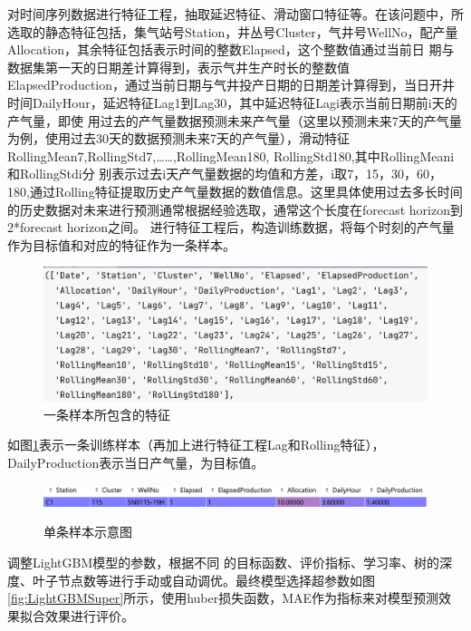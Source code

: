 对时间序列数据进行特征工程，抽取延迟特征、滑动窗口特征等。在该问题中，所选取的静态特征包括，集气站号Station，井丛号Cluster，气井号WellNo，配产量Allocation，其余特征包括表示时间的整数Elapsed，这个整数值通过当前日
期与数据集第一天的日期差计算得到，表示气井生产时长的整数值ElapsedProduction，通过当前日期与气井投产日期的日期差计算得到，当日开井时间DailyHour，延迟特征Lag1到Lag30，其中延迟特征Lagi表示当前日期前i天的产气量，即使
用过去的产气量数据预测未来产气量（这里以预测未来7天的产气量为例，使用过去30天的数据预测未来7天的产气量），滑动特征RollingMean7,RollingStd7,……,RollingMean180, RollingStd180,其中RollingMeani和RollingStdi分
别表示过去i天产气量数据的均值和方差，i取{7，15，30，60，180},通过Rolling特征提取历史产气量数据的数值信息。这里具体使用过去多长时间的历史数据对未来进行预测通常根据经验选取，通常这个长度在forecast horizon到2*forecast horizon之间。
进行特征工程后，构造训练数据，将每个时刻的产气量作为目标值和对应的特征作为一条样本。
\begin{figure}[H]
    \centering
    \caption{一条样本所包含的特征}
    \includegraphics{figure/asamplefeature.png}
\end{figure}
如图\ref{fig:singlesample}表示一条训练样本（再加上进行特征工程Lag和Rolling特征），DailyProduction表示当日产气量，为目标值。
\begin{figure}[H]
    \centering
    \caption{单条样本示意图}
    \includegraphics{figure/singlesample.png}
    \label{fig:singlesample}
\end{figure}
调整LightGBM模型的参数，根据不同
的目标函数、评价指标、学习率、树的深度、叶子节点数等进行手动或自动调优。最终模型选择超参数如图\ref{fig:LightGBMSuper}所示，使用huber损失函数，MAE作为指标来对模型预测效果拟合效果进行评价。
